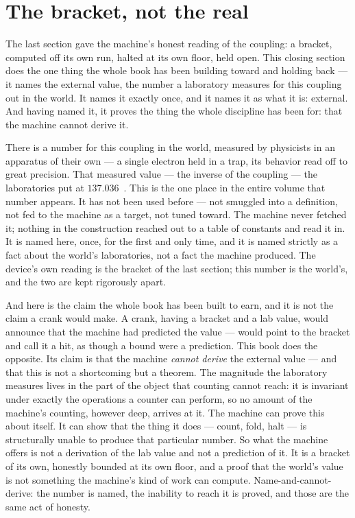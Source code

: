 \section{The bracket, not the real}

The last section gave the machine's honest reading of the coupling: a bracket, computed off its own run, halted at its
own floor, held open. This closing section does the one thing the whole book has been building toward and holding back
--- it names the external value, the number a laboratory measures for this coupling out in the world. It names it
exactly once, and it names it as what it is: external. And having named it, it proves the thing the whole discipline
has been for: that the machine cannot derive it.

There is a number for this coupling in the world, measured by physicists in an apparatus of their own --- a single
electron held in a trap, its behavior read off to great precision. That measured value --- the inverse of the coupling
--- the laboratories put at $137.036$~\cite{hanneke2008}. This is the one place in the entire volume that number
appears. It has not been used before --- not smuggled into a definition, not fed to the machine as a target, not tuned
toward. The machine never fetched it; nothing in the construction reached out to a table of constants and read it in.
It is named here, once, for the first and only time, and it is named strictly as a fact about the world's
laboratories, not a fact the machine produced. The device's own reading is the bracket of the last section; this number
is the world's, and the two are kept rigorously apart.

And here is the claim the whole book has been built to earn, and it is not the claim a crank would make. A crank,
having a bracket and a lab value, would announce that the machine had predicted the value --- would point to the
bracket and call it a hit, as though a bound were a prediction. This book does the opposite. Its claim is that the machine \emph{cannot
derive} the external value --- and that this is not a shortcoming but a theorem. The magnitude the laboratory measures
lives in the part of the object that counting cannot reach: it is invariant under exactly the operations a counter can
perform, so no amount of the machine's counting, however deep, arrives at it. The machine can prove this about itself.
It can show that the thing it does --- count, fold, halt --- is structurally unable to produce that particular
number. So what the machine offers is not a derivation of the lab value and not a prediction of it. It is a bracket of
its own, honestly bounded at its own floor, and a proof that the world's value is not something the machine's kind of
work can compute. Name-and-cannot-derive: the number is named, the inability to reach it is proved, and those are the
same act of honesty.

